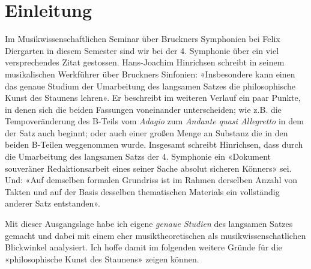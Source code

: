 \section{Einleitung}

Im Musikwissenschaftlichen Seminar über Bruckners Symphonien bei Felix Diergarten in diesem Semester sind wir bei der 4. Symphonie über ein viel versprechendes Zitat gestossen.
Hans-Joachim Hinrichsen schreibt in seinem musikalischen Werkführer über Bruckners Sinfonien: «Insbesondere kann einen das genaue Studium der Umarbeitung des langsamen Satzes die philosophische Kunst des Staunens lehren»\autocite[76]{hinrichsen:bruckner}.
Er beschreibt im weiteren Verlauf ein paar Punkte, in denen sich die beiden Fassungen voneinander unterscheiden; wie z.B. die Tempoveränderung des B-Teils vom \emph{Adagio} zum \emph{Andante quasi Allegretto} in dem der Satz auch beginnt; oder auch einer großen Menge an Substanz die in den beiden B-Teilen weggenommen wurde.
Insgesamt schreibt Hinrichsen, dass durch die Umarbeitung des langsamen Satzs der 4. Symphonie ein «Dokument souveräner Redaktionsarbeit eines seiner Sache absolut sicheren Könners»\autocite[77]{hinrichsen:bruckner} sei.
Und: «Auf demselben formalen Grundriss ist im Rahmen derselben Anzahl von Takten und auf der Basis desselben thematischen Materials ein vollständig anderer Satz entstanden»\autocite[77]{hinrichsen:bruckner}.

Mit dieser Ausgangslage habe ich eigene \emph{genaue Studien} des langsamen Satzes gemacht und dabei mit einem eher musiktheoretischen als musikwissenschatlichen Blickwinkel analysiert.
Ich hoffe damit im folgenden weitere Gründe für die «philosophische Kunst des Staunens» zeigen können.
